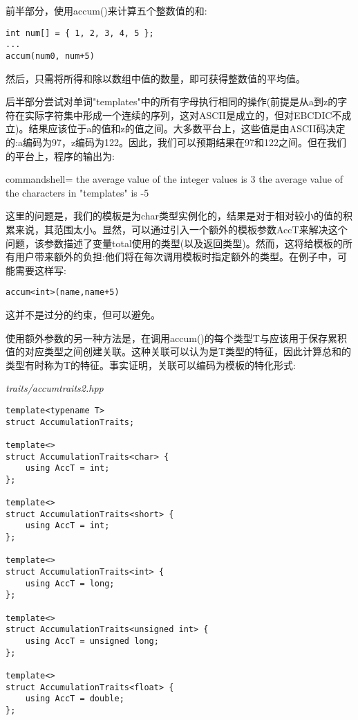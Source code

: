前半部分，使用accum()来计算五个整数值的和:

\begin{lstlisting}[style=styleCXX]
int num[] = { 1, 2, 3, 4, 5 };
...
accum(num0, num+5)
\end{lstlisting}

然后，只需将所得和除以数组中值的数量，即可获得整数值的平均值。

后半部分尝试对单词"templates"中的所有字母执行相同的操作(前提是从a到z的字符在实际字符集中形成一个连续的序列，这对ASCII是成立的，但对EBCDIC不成立)。结果应该位于a的值和z的值之间。大多数平台上，这些值是由ASCII码决定的:a编码为97，z编码为122。因此，我们可以预期结果在97和122之间。但在我们的平台上，程序的输出为:

\begin{tcblisting}{commandshell={}}
the average value of the integer values is 3
the average value of the characters in "templates" is -5
\end{tcblisting}

这里的问题是，我们的模板是为char类型实例化的，结果是对于相对较小的值的积累来说，其范围太小。显然，可以通过引入一个额外的模板参数AccT来解决这个问题，该参数描述了变量total使用的类型(以及返回类型)。然而，这将给模板的所有用户带来额外的负担:他们将在每次调用模板时指定额外的类型。在例子中，可能需要这样写:

\begin{lstlisting}[style=styleCXX]
accum<int>(name,name+5)
\end{lstlisting}

这并不是过分的约束，但可以避免。

使用额外参数的另一种方法是，在调用accum()的每个类型T与应该用于保存累积值的对应类型之间创建关联。这种关联可以认为是T类型的特征，因此计算总和的类型有时称为T的特征。事实证明，关联可以编码为模板的特化形式:

\noindent
\textit{traits/accumtraits2.hpp}
\begin{lstlisting}[style=styleCXX]
template<typename T>
struct AccumulationTraits;

template<>
struct AccumulationTraits<char> {
	using AccT = int;
};

template<>
struct AccumulationTraits<short> {
	using AccT = int;
};

template<>
struct AccumulationTraits<int> {
	using AccT = long;
};

template<>
struct AccumulationTraits<unsigned int> {
	using AccT = unsigned long;
};

template<>
struct AccumulationTraits<float> {
	using AccT = double;
};
\end{lstlisting}

